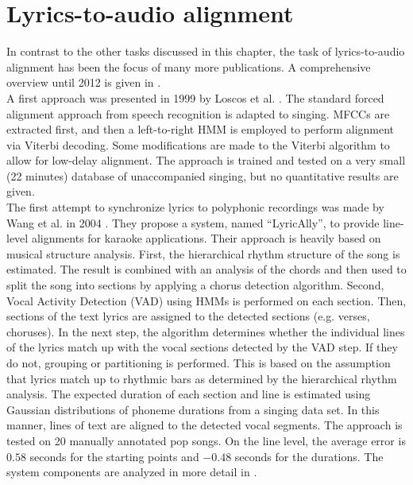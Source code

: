 \section{Lyrics-to-audio alignment}
In contrast to the other tasks discussed in this chapter, the task of lyrics-to-audio alignment has been the focus of many more publications. A comprehensive overview until 2012 is given in \cite{goto_alignment}.\\

A first approach was presented in 1999 by Loscos et al. \cite{loscos}. The standard forced alignment approach from speech recognition is adapted to singing. MFCCs are extracted first, and then a left-to-right HMM is employed to perform alignment via Viterbi decoding. Some modifications are made to the Viterbi algorithm to allow for low-delay alignment. The approach is trained and tested on a very small (22 minutes) database of unaccompanied singing, but no quantitative results are given.\\

The first attempt to synchronize lyrics to polyphonic recordings was made by Wang et al. in 2004 \cite{Wang2004}. They propose a system, named ``LyricAlly'', to provide line-level alignments for karaoke applications. Their approach is heavily based on musical structure analysis. First, the hierarchical rhythm structure of the song is estimated. The result is combined with an analysis of the chords and then used to split the song into sections by applying a chorus detection algorithm. Second, Vocal Activity Detection (VAD) using HMMs is performed on each section. Then, sections of the text lyrics are assigned to the detected sections (e.g. verses, choruses). In the next step, the algorithm determines whether the individual lines of the lyrics match up with the vocal sections detected by the VAD step. If they do not, grouping or partitioning is performed. This is based on the assumption that lyrics match up to rhythmic bars as determined by the hierarchical rhythm analysis. The expected duration of each section and line is estimated using Gaussian distributions of phoneme durations from a singing data set. In this manner, lines of text are aligned to the detected vocal segments. The approach is tested on 20 manually annotated pop songs. On the line level, the average error is $0.58$ seconds for the starting points and $-0.48$ seconds for the durations. The system components are analyzed in more detail in \cite{lyrically}.\\

